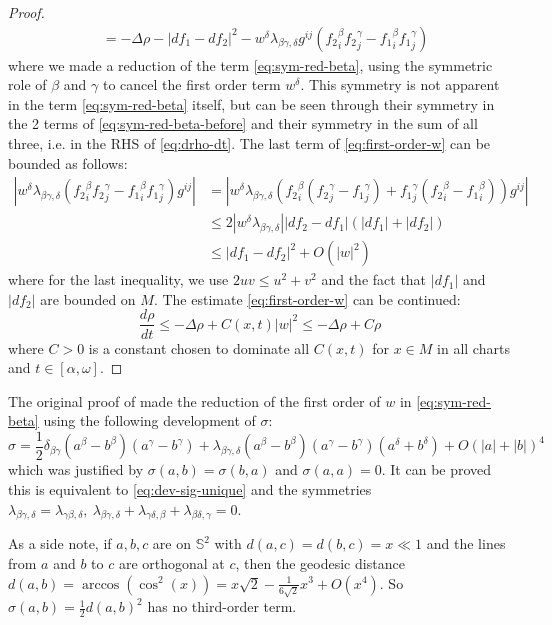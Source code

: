 \begin{proof}
\begin{align}
		   & = -\Delta \rho - |df_1 -df_2|^2 - w^\delta \lambda_{\beta\gamma,\delta}g^{ij}\left(  {f_2}^\beta_i {f_2}^\gamma_j - {f_1}^\beta_i {f_1}^\gamma_j  \right) \label{eq:first-order-w}
\end{align}
where we made a reduction of the term \eqref{eq:sym-red-beta}, using the symmetric role of \(\beta\) and
\(\gamma\) to cancel the first order term \(w^\delta\). This symmetry is not apparent
in the term \eqref{eq:sym-red-beta} itself, but can be seen through their symmetry in the
2 terms of \eqref{eq:sym-red-beta-before} and their symmetry in the sum of all three,
i.e. in the RHS of \eqref{eq:drho-dt}. The last term of \eqref{eq:first-order-w} can be bounded as follows:
\begin{align*}
    \left | w^\delta \lambda_{\beta\gamma,\delta}\left({f_2}^\beta_i {f_2}^\gamma_j -
{f_1}^\beta_i {f_1}^\gamma_j\right) g^{ij} \right| &=   \left | w^\delta \lambda_{\beta\gamma,\delta}\left({f_2}^\beta_i ({f_2}^\gamma_j - {f_1}^\gamma_j) + {f_1}^\gamma_j({f_2}^\beta_i -
{f_1}^\beta_i) \right) g^{ij} \right| \\
	       &\leq 2 |w^\delta \lambda_{\beta\gamma,\delta}| |df_2 -df_1| (|df_1| + |df_2|)\\
	       &\leq |df_1 - df_2|^2 + O(|w|^2)
\end{align*}
where for the last inequality, we use \(2uv \leq u^2 + v^2\) and the fact that \(|df_1|\) and \(|df_2|\) are bounded on \(M\). The estimate \eqref{eq:first-order-w} can be
continued:
\[
 \frac{d \rho}{d t}\leq -\Delta\rho + C(x,t) |w|^2 \leq -\Delta \rho + C \rho
\]
where \(C >0\) is a constant chosen to dominate all \(C(x,t)\) for \(x\in M\) in all
charts and \(t\in [\alpha,\omega]\).
\end{proof}

\begin{remark}
\label{rem:hamilton-alg-rig}
The original proof of \cite{hamilton_harmonic_1975}
made the reduction of the first order of \(w\) in \eqref{eq:sym-red-beta} using
the following development of \(\sigma\):
\[
 \sigma = \frac{1}{2}\delta_{\beta\gamma} (a^\beta - b^\beta)(a^\gamma - b^\gamma) +
\lambda_{\beta\gamma,\delta} (a^\beta - b^\beta)(a^\gamma -b^\gamma)(a^\delta + b^\delta) + O(|a|+|b|)^4
\]
which was justified by \(\sigma(a,b) = \sigma(b,a)\) and \(\sigma(a,a)=0\). It can be proved this is equivalent to \eqref{eq:dev-sig-unique} and the symmetries \(\lambda_{\beta\gamma,\delta} =
\lambda_{\gamma\beta,\delta},\ \lambda_{\beta\gamma,\delta}
+\lambda_{\gamma\delta,\beta} + \lambda_{\beta\delta,\gamma}= 0\).

As a side note, if \(a,b,c\) are on \(\mathbb{S}^2\) with \(d(a,c) = d(b,c) = x \ll 1\)
and the lines from \(a\) and \(b\) to \(c\) are orthogonal at \(c\), then the
geodesic distance \(d(a,b) = \arccos(\cos^2(x)) = x\sqrt{2} - \frac{1}{6\sqrt{2}}x^3 +
O(x^4)\). So \(\sigma(a,b) = \frac{1}{2}d(a,b)^2\) has no third-order term.
\end{remark}

